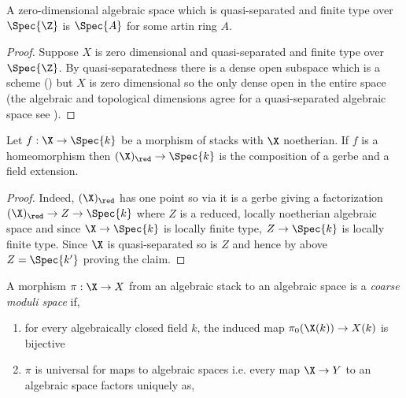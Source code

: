 \documentclass[12pt]{article}
\begin{document}
\begin{prop}
A zero-dimensional algebraic space which is quasi-separated and finite type over $\Spec{\Z}$ is $\Spec{A}$ for some artin ring $A$.
\end{prop}

\begin{proof}
Suppose $X$ is zero dimensional and quasi-separated and finite type over $\Spec{\Z}$. By quasi-separatedness there is a dense open subspace which is a scheme () but $X$ is zero dimensional so the only dense open in the entire space (the algebraic and topological dimensions agree for a quasi-separated algebraic space see ).
\end{proof}

\begin{prop}
Let $f : \X \to \Spec{k}$ be a morphism of stacks with $\X$ noetherian. If $f$ is a homeomorphism then $(\X)_{\red} \to \Spec{k}$ is the composition of a gerbe and a field extension.
\end{prop}

\begin{proof}
Indeed, $(\X)_{\red}$ has one point so via  it is a gerbe giving a factorization $(\X)_{\red} \to Z \to \Spec{k}$ where $Z$ is a reduced, locally noetherian algebraic space and since $\X \to \Spec{k}$ is locally finite type, $Z \to \Spec{k}$ is locally finite type. Since $\X$ is quasi-separated so is $Z$ and hence by above $Z = \Spec{k'}$ proving the claim.
\end{proof}

\begin{defn}
A morphism $\pi : \X \to X$ from an algebraic stack to an algebraic space is a \textit{coarse moduli space} if,
\begin{enumerate}
\item for every algebraically closed field $k$, the induced map $\pi_0(\X(k)) \to X(k)$ is bijective
\item $\pi$ is universal for maps to algebraic spaces i.e. every map $\X \to Y$ to an algebraic space factors uniquely as,
\begin{center}
\end{center}
\end{enumerate}
\end{defn}
\end{document}
